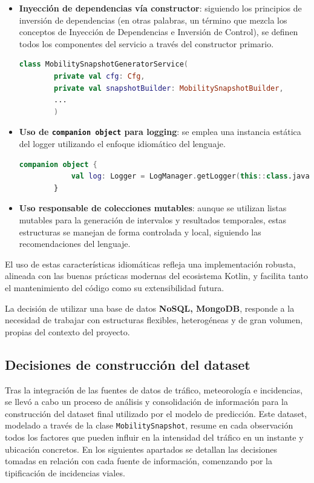 \begin{itemize}
	\item \textbf{Inyección de dependencias vía constructor}: siguiendo los principios de inversión de dependencias (en otras palabras, un término que mezcla los conceptos de Inyección de Dependencias e Inversión de Control), se definen todos los componentes del servicio a través del constructor primario.
	\begin{lstlisting}[language=Kotlin]
		class MobilitySnapshotGeneratorService(
		private val cfg: Cfg,
		private val snapshotBuilder: MobilitySnapshotBuilder,
		...
		)
	\end{lstlisting}
	
	\item \textbf{Uso de \texttt{companion object} para logging}: se emplea una instancia estática del logger utilizando el enfoque idiomático del lenguaje.
	\begin{lstlisting}[language=Kotlin]
		companion object {
			val log: Logger = LogManager.getLogger(this::class.java)
		}
	\end{lstlisting}
	
	\item \textbf{Uso responsable de colecciones mutables}: aunque se utilizan listas mutables para la generación de intervalos y resultados temporales, estas estructuras se manejan de forma controlada y local, siguiendo las recomendaciones del lenguaje.
\end{itemize}

El uso de estas características idiomáticas refleja una implementación robusta, alineada con las buenas prácticas modernas del ecosistema Kotlin, y facilita tanto el mantenimiento del código como su extensibilidad futura.

La decisión de utilizar una base de datos \textbf{NoSQL, MongoDB}, responde a la necesidad de trabajar con estructuras flexibles, heterogéneas y de gran volumen, propias del contexto del proyecto.

\subsection{Decisiones de construcción del dataset}

Tras la integración de las fuentes de datos de tráfico, meteorología e incidencias, se llevó a cabo un proceso de análisis y consolidación de información para la construcción del dataset final utilizado por el modelo de predicción. Este dataset, modelado a través de la clase \texttt{MobilitySnapshot}, resume en cada observación todos los factores que pueden influir en la intensidad del tráfico en un instante y ubicación concretos. En los siguientes apartados se detallan las decisiones tomadas en relación con cada fuente de información, comenzando por la tipificación de incidencias viales.


